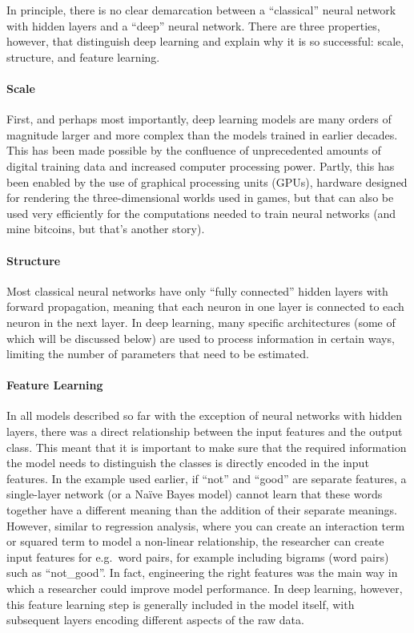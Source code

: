 In principle, there is no clear demarcation between a ``classical'' neural network with hidden layers and a ``deep'' neural network.
There are three properties, however, that distinguish deep learning and explain why it is so successful: scale, structure, and feature learning.

\paragraph{Scale} First, and perhaps most importantly, deep learning models are many orders of magnitude larger and more complex than the models
trained in earlier decades.
This has been made possible by the confluence of unprecedented amounts of digital training data and increased computer processing power.
Partly, this has been enabled by the use of graphical processing units (GPUs), hardware designed for rendering the three-dimensional worlds used in games,
but that can also be used very efficiently for the computations needed to train neural networks (and mine bitcoins, but that's another story).

\paragraph{Structure} Most classical neural networks have only ``fully connected'' hidden layers with forward propagation,
meaning that each neuron in one layer is connected to each neuron in the next layer.
In deep learning, many specific architectures (some of which will be discussed below) are used to process information in certain ways,
limiting the number of parameters that need to be estimated.

\paragraph{Feature Learning}
In all models described so far with the exception of neural networks with hidden layers,
there was a direct relationship between the input features and the output class.
This meant that it is important to make sure that the required information the model needs to distinguish the classes
is directly encoded in the input features.
In the example used earlier, if ``not'' and ``good'' are separate features, a single-layer network (or a Na\"ive Bayes model)
cannot learn that these words together have a different meaning than the addition of their separate meanings.
However, similar to regression analysis, where you can create an interaction term or squared term to model a non-linear relationship,
the researcher can create input features for e.g.\ word pairs, for example including bigrams (word pairs) such as ``not\_good''.
In fact, engineering the right features was the main way in which a researcher could improve model performance.
In deep learning, however, this feature learning step is generally included in the model itself,
with subsequent layers encoding different aspects of the raw data.

